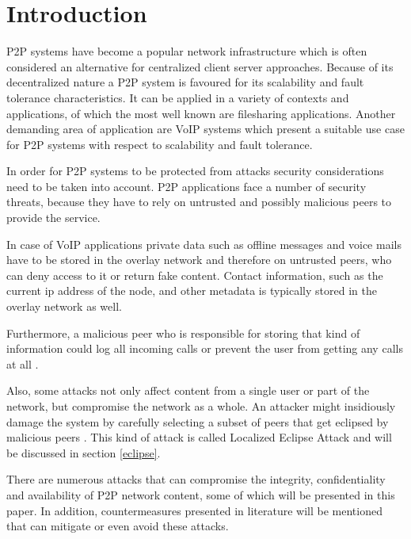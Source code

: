 \documentclass[a4paper,conference]{IEEEtran}
\begin{document}
\section{Introduction}

P2P systems have become a popular network infrastructure which is often considered
an alternative for centralized client server approaches. Because of its decentralized
nature a P2P system is favoured for its scalability and fault tolerance characteristics. 
It can be applied in a variety of contexts and applications, of which the most well known
are filesharing applications. Another demanding area of application are VoIP systems 
which present a suitable use case for P2P systems with respect to scalability and 
fault tolerance. 

In order for P2P systems to be protected from attacks security considerations need to be taken into account. 
P2P applications face a number of security threats, because they have
to rely on untrusted and possibly malicious peers to provide the service.

In case of VoIP applications private data such as offline messages and voice mails have to be
stored in the overlay network and therefore on untrusted peers, who can
deny access to it or return fake content. Contact information, such as the
current ip address of the node, and other metadata is typically stored in the
overlay network as well.

Furthermore, a malicious peer who is
responsible for storing that kind of information could log all incoming calls or
prevent the user from getting any calls at all
\cite{touceda}.

Also, some attacks not only affect content from a single user or part of the network, 
but compromise the network as a whole. An attacker might insidiously
damage the system by carefully selecting a subset of
peers that get eclipsed by malicious peers \cite{germanus}. This kind of attack
is called Localized Eclipse Attack and will be discussed in section \ref{eclipse}. 

There are numerous attacks that can compromise the integrity, confidentiality and availability 
of P2P network content, some of which will be presented in this paper. In addition, countermeasures
presented in literature will be mentioned that can mitigate or even avoid these attacks. 


\end{document}
